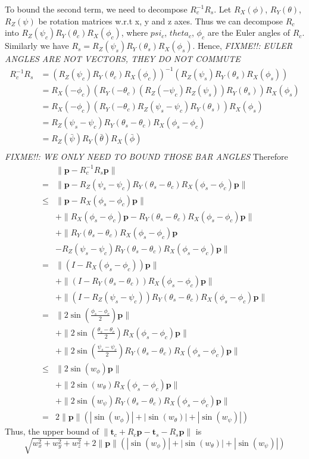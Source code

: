 \documentclass[review]{acmsiggraph}
\newcommand{\bt}{\mathbf{t}}
\newcommand{\bp}{\mathbf{p}}
\begin{document}
To bound the second term, we need to decompose $R_c^{-1}R_s$.
Let $R_X(\phi)$, $R_Y(\theta)$, $R_Z(\psi)$ be rotation matrices w.r.t x, y and z axes.
Thus we can decompose $R_c$ into $R_Z(\psi_c)R_Y(\theta_c)R_X(\phi_c)$, where $psi_c$, $theta_c$, $\phi_c$ are the Euler angles of $R_c$.
Similarly we have $R_s=R_Z(\psi_s)R_Y(\theta_s)R_X(\phi_s)$.
Hence,
\emph{FIXME!!: EULER ANGLES ARE NOT VECTORS, THEY DO NOT COMMUTE}
\begin{align*}
	R_c^{-1}R_s &= (R_Z(\psi_c)R_Y(\theta_c)R_X(\phi_c))^{-1}(R_Z(\psi_s)R_Y(\theta_s)R_X(\phi_s)) \\
	&= R_X(-\phi_c)(R_Y(-\theta_c)(R_Z(-\psi_c)R_Z(\psi_s))R_Y(\theta_s))R_X(\phi_s) \\
	&= R_X(-\phi_c)(R_Y(-\theta_c)R_Z(\psi_s-\psi_c)R_Y(\theta_s))R_X(\phi_s) \\
	&= R_Z(\psi_s-\psi_c)R_Y(\theta_s-\theta_c)R_X(\phi_s-\phi_c) \\
	&= R_Z(\bar{\psi})R_Y(\bar{\theta})R_X(\bar{\phi}) \\
\end{align*}
\emph{FIXME!!: WE ONLY NEED TO BOUND THOSE BAR ANGLES}
Therefore
\begin{align*}
	 & \| \bp - R_c^{-1}R_s \bp\| \\
	=& \| \bp - R_Z(\psi_s-\psi_c)R_Y(\theta_s-\theta_c)R_X(\phi_s-\phi_c)\bp\| \\
	\le& \| \bp - R_X(\phi_s-\phi_c)\bp \| \\
	 &+ \| R_X(\phi_s-\phi_c)\bp - R_Y(\theta_s-\theta_c)R_X(\phi_s-\phi_c)\bp \| \\
	 &+ \|R_Y(\theta_s-\theta_c)R_X(\phi_s-\phi_c)\bp \\
	 &  - R_Z(\psi_s-\psi_c)R_Y(\theta_s-\theta_c)R_X(\phi_s-\phi_c)\bp\| \\
	=& \| (I - R_X(\phi_s-\phi_c))\bp \| \\
	 &+ \| (I - R_Y(\theta_s-\theta_c))R_X(\phi_s-\phi_c)\bp \| \\
	 &+ \| (I - R_Z(\psi_s-\psi_c))R_Y(\theta_s-\theta_c)R_X(\phi_s-\phi_c)\bp\| \\
	=& \| 2\sin(\frac{\phi_s-\phi_c}{2})\bp \| \\
	 &+ \| 2\sin(\frac{\theta_s-\theta_c}{2})R_X(\phi_s-\phi_c)\bp \| \\
	 &+ \| 2\sin(\frac{\psi_s-\psi_c}{2})R_Y(\theta_s-\theta_c)R_X(\phi_s-\phi_c)\bp\| \\
	\le& \| 2\sin(w_\phi)\bp \| \\
	 &+ \| 2\sin(w_\theta)R_X(\phi_s-\phi_c)\bp \| \\
	 &+ \| 2\sin(w_\psi)R_Y(\theta_s-\theta_c)R_X(\phi_s-\phi_c)\bp\| \\
	=& 2\|\bp\|(|\sin(w_\phi)|+|\sin(w_\theta)|+|\sin(w_\psi)|)
\end{align*}
Thus, the upper bound of $\|\bt_c + R_c\bp - \bt_s - R_s\bp\|$ is
\[
\sqrt{w_x^2 + w_y^2+w_z^2} + 2\|\bp\|(|\sin(w_\phi)|+|\sin(w_\theta)|+|\sin(w_\psi)|)
\]
\end{document}
